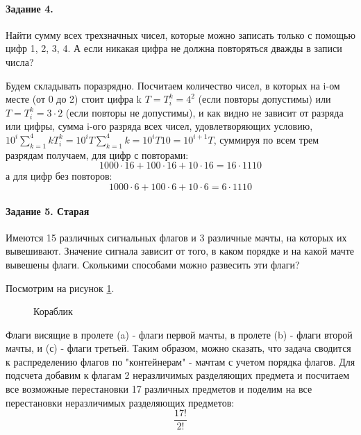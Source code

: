 \documentclass[a4paper,12pt]{article}
\begin{document}
\paragraph{Задание 4.} Найти сумму всех трехзначных чисел, которые можно записать только с помощью цифр 1, 2, 3, 4. А если никакая цифра не должна повторяться дважды в записи числа?
\begin{Solution}
	Будем складывать поразрядно. Посчитаем количество чисел, в которых на i-ом месте (от 0 до 2) стоит цифра k $T = T_i^k = 4^2$ (если повторы допустимы) или $T = T_i^k = 3 \cdot 2$ (если повторы не допустимы), и как видно не зависит от разряда или цифры, сумма i-ого разряда всех чисел, удовлетворяющих условию, $10^i \sum_{k=1}^{4}k T_i^k = 10^i T \sum_{k=1}^{4} k = 10^i T 10 = 10^{i+1} T$, суммируя по всем трем разрядам получаем, для цифр с повторами:
\[
	1000 \cdot 16 + 100 \cdot 16 + 10 \cdot 16 = 16 \cdot 1110
\]
а для цифр без повторов:
\[
	1000 \cdot 6 + 100 \cdot 6 + 10 \cdot 6 = 6 \cdot 1110
\]
\end{Solution}
\paragraph{Задание 5. Старая} Имеются 15 различных сигнальных флагов и 3 различные мачты, на которых их вывешивают. Значение сигнала зависит от того, в каком порядке и на какой мачте вывешены флаги. Сколькими способами можно развесить эти флаги?
\begin{Solution}
Посмотрим на рисунок \ref{pic::ship}.
\begin{figure}[h]
	\noindent{}
	\caption{Кораблик}
	\label{pic::ship}
\end{figure}
Флаги висящие в пролете (a) - флаги первой мачты, в пролете (b) - флаги второй мачты, и (с) - флаги третьей. Таким образом, можно сказать, что задача сводится к распределению флагов по "контейнерам" - мачтам с учетом порядка флагов. Для подсчета добавим к флагам 2 неразличимых разделяющих предмета и посчитаем все возможные перестановки 17 различных предметов и поделим на все перестановки неразличимых разделяющих предметов: \[\frac{17!}{2!}\]
\end{Solution}
\end{document}
